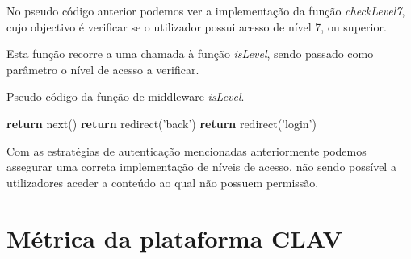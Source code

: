 No pseudo código anterior podemos ver a implementação da função \emph{checkLevel7}, cujo objectivo é verificar se o utilizador possui acesso de nível 7, ou superior.

Esta função recorre a uma chamada à função \emph{isLevel}, sendo passado como parâmetro o nível de acesso a verificar.

\begin{algorithm}
    \caption{Pseudo código da função de middleware \emph{isLevel}.}
    \begin{algorithmic}[1]
                \State \textbf{return} next()
            \Else
                \State \textbf{return} redirect('back')
            \EndIf
        \Else
            \State \textbf{return} redirect('login')
        \EndIf
    \EndFunction
    \end{algorithmic}
\end{algorithm}

Com as estratégias de autenticação mencionadas anteriormente podemos assegurar uma correta implementação de níveis de acesso, não sendo possível a utilizadores aceder a conteúdo ao qual não possuem permissão.

\section{Métrica da plataforma CLAV}